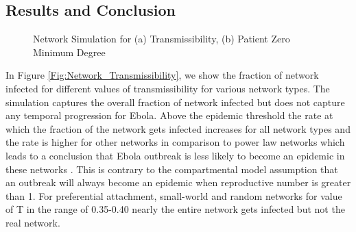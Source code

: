 \documentclass[10pt, journal,onecolumn]{IEEEtran}
\begin{document}
\subsection{{Results and Conclusion}}

\begin{figure}[ht]
\centering
{}
\quad
{}
\caption{Network Simulation for (a) Transmissibility, (b) Patient Zero Minimum Degree}
\end{figure}

In Figure  \ref{Fig:Network_Transmissibility}, we show the fraction of network infected for different values of transmissibility for  various network types.  The simulation captures the overall fraction of network infected  but does not capture any temporal progression for Ebola. Above the epidemic threshold the rate at which the  fraction of the network gets infected increases for all network types and the rate is higher for other networks in comparison to power law networks which leads to a conclusion that Ebola outbreak is less likely to become an epidemic in these networks . This is contrary to the compartmental model assumption that an outbreak will always become an epidemic when reproductive number is greater than 1. For preferential attachment, small-world and random networks for value of T in the range of 0.35-0.40 nearly the entire network gets infected but not the real network.
\end{document}
